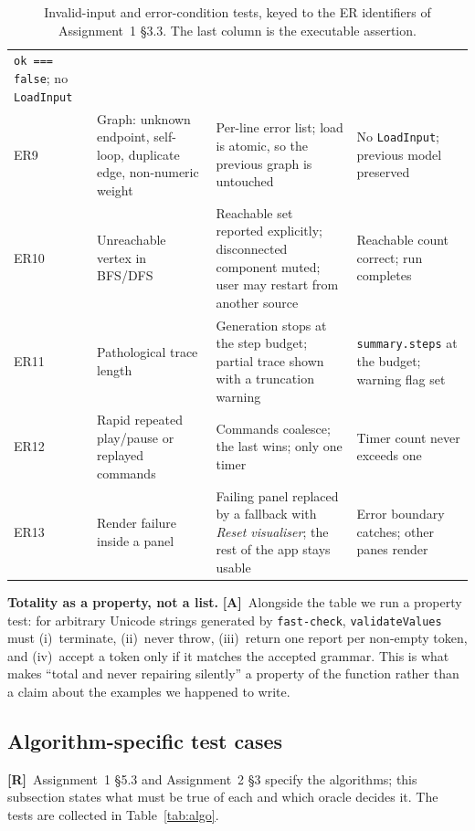\documentclass[11pt,a4paper]{article}
\newcommand{\R}{\textcolor{reqc}{\textbf{[R]}}}     %
\newcommand{\A}{\textcolor{asmc}{\textbf{[A]}}}     %
\newcommand{\ct}[1]{\texttt{#1}}
\begin{document}
\begin{table}[H]
\begin{tabular}{@{}L{1.2cm}L{4.4cm}L{5.4cm}L{3.2cm}@{}}
\ct{ok === false}; no \ct{LoadInput} \\
ER9 & Graph: unknown endpoint, self-loop, duplicate edge, non-numeric weight & Per-line error
list; load is atomic, so the previous graph is untouched & No \ct{LoadInput}; previous model
preserved \\
ER10 & Unreachable vertex in BFS/DFS & Reachable set reported explicitly; disconnected
component muted; user may restart from another source & Reachable count correct; run
completes \\
ER11 & Pathological trace length & Generation stops at the step budget; partial trace shown
with a truncation warning & \ct{summary.steps} at the budget; warning flag set \\
ER12 & Rapid repeated play/pause or replayed commands & Commands coalesce; the last wins;
only one timer & Timer count never exceeds one \\
ER13 & Render failure inside a panel & Failing panel replaced by a fallback with \emph{Reset
visualiser}; the rest of the app stays usable & Error boundary catches; other panes render \\
\bottomrule
\end{tabular}
\caption{Invalid-input and error-condition tests, keyed to the ER identifiers of Assignment~1
\S3.3. The last column is the executable assertion.}
\label{tab:invalid}
\end{table}

\noindent\textbf{Totality as a property, not a list.} \A\ Alongside the table we run a
property test: for arbitrary Unicode strings generated by \ct{fast-check},
\ct{validateValues} must (i)~terminate, (ii)~never throw, (iii)~return one report per
non-empty token, and (iv)~accept a token only if it matches the accepted grammar. This is
what makes ``total and never repairing silently'' a property of the function rather than a
claim about the examples we happened to write.

\subsection{Algorithm-specific test cases}

\R\ Assignment~1 \S5.3 and Assignment~2 \S3 specify the algorithms; this subsection states
what must be true of each and which oracle decides it. The tests are collected in
Table~\ref{tab:algo}.
\end{document}
